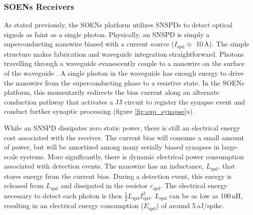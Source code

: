 \documentclass[twocolumn]{article}
\begin{document}
\subsubsection{SOENs Receivers}
As stated previously, the SOENs platform utilizes SNSPDs to detect optical signals as faint as a single photon. Physically, an SNSPD is simply a superconducting nanowire biased with a current source ($I_{\mathrm{spd}} \approx$ 10\,\textmu A). The simple structure makes fabrication and waveguide integration straightforward. Photons travelling through a waveguide evanescently couple to a nanowire on the surface of the waveguide \cite{ferrari2018waveguide, akhlaghi2015waveguide}. A single photon in the waveguide has enough energy to drive the nanowire from the superconducting phase to a resistive state. In the SOENs platform, this momentarily redirects the bias current along an alternate conduction pathway that activates a JJ circuit to register the synapse event and conduct further synaptic processing (figure \ref{fig:sup_synapse}a).

While an SNSPD dissipates zero static power, there is still an electrical energy cost associated with the receiver. The current bias will consume a small amount of  power, but will be amortized among many serially biased synapses in large-scale systems. More significantly, there is dynamic electrical power consumption associated with detection events. The nanowire has an inductance, $L_{\mathrm{spd}}$, that stores energy from the current bias. During a detection event, this energy is released from $L_{\mathrm{spd}}$ and dissipated in the resistor $r_{\mathrm{spd}}$. The electrical energy necessary to detect each photon is then $\frac{1}{2}L_{\mathrm{spd}}I_{\mathrm{spd}}^2$. $L_{\mathrm{spd}}$ can be as low as 100\,nH, resulting in an electrical energy consumption ($E_{\mathrm{spd}}$) of around 5\,aJ/spike.
\end{document}
